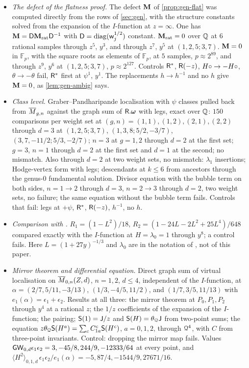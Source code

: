 \begin{itemize}
\item \emph{The defect of the flatness proof.} The defect $\mathbf{M}$ of \cref{prop:gen-flat} was computed directly from the rows of \cref{sec:gen}, with the structure constants solved from the expansion of the $I$-function at $z=\infty$. One has $\mathbf{M}=\mathsf{D}\mathbf{M}_{\mathrm{rat}}\mathsf{D}^{-1}$ with $\mathsf{D}=\mathrm{diag}(\mathsf{w}_j^{1/2})$ constant. $\mathbf{M}_{\mathrm{rat}}=0$ over $\mathbb{Q}$ at $6$ rational samples through $z^5$, $y^3$, and through $z^7$, $y^5$ at $(1,2,5;3,7)$. $\mathbf{M}=0$ in $\mathbb{F}_p$, with the square roots as elements of $\mathbb{F}_p$, at $5$ samples, $p\approx 2^{89}$, and through $z^9$, $y^6$ at $(1,2,5;3,7)$, $p\approx 2^{127}$. Controls $\mathsf{R}^*$, $\mathsf{R}(-z)$, $H\circ\to-H\circ$, $\theta\to-\theta$ fail, $\mathsf{R}^*$ first at $\psi^1$, $y^1$. The replacements $h\to h^{-1}$ and no $h$ give $\mathbf{M}=0$, as \cref{lem:gen-ambig} says.
\item \emph{Class level.} Graber--Pandharipande localisation with $\psi$ classes pulled back from $\overline{M}_{g,n}$ against the graph sum of $\mathsf{R}.\boldsymbol{\omega}$ with legs, exact over $\mathbb{Q}$: $150$ comparisons per weight set at $(g,n)=(1,1),(1,2),(2,1),(2,2)$ through $d=3$ at $(1,2,5;3,7)$, $(1,3,8;5/2,-3/7)$, $(3,7,-11/2;5/3,-2/7)$; $n=3$ at $g=1,2$ through $d=2$ at the first set; $g=3$, $n=1$ through $d=2$ at the first set and $d=1$ at the second; no mismatch. Also through $d=2$ at two weight sets, no mismatch: $\lambda_1$ insertions; Hodge-vertex form with legs; descendants at $k\leq 6$ from ancestors through the genus-$0$ fundamental solution. Divisor equation with the bubble term on both sides, $n=1\to2$ through $d=3$, $n=2\to3$ through $d=2$, two weight sets, no failure; the same equation without the bubble term fails. Controls that fail: legs at $+\psi$, $\mathsf{R}^*$, $\mathsf{R}(-z)$, $h^{-1}$, no $h$.
\item \emph{Comparison with \cite{LP18}.} $R_1=(1-L^2)/18$, $R_2=(1-24L-2L^2+25L^4)/648$ compared exactly with the $I$-function at $H=\lambda_0=1$ through $y^8$; a control fails. Here $L=(1+27y)^{-1/3}$ and $\lambda_0$ are in the notation of \cite{LP18}, not of this paper.
\item \emph{Mirror theorem and differential equation.} Direct graph sum of virtual localisation on $\overline{M}_{0,n}(Z,d)$, $n=1,2$, $d\leq 4$, independent of the $I$-function, at $\alpha=(2/7,5/11,-3/13)$, $(1/3,-4/5,11/2)$, and $(1/7,3/5,11/13)$ with $e_1(\alpha)=\epsilon_1+\epsilon_2$. Results at all three: the mirror theorem at $P_0,P_1,P_2$ through $y^4$ at a rational $z$; the $1/z$ coefficients of the expansion of the $I$-function; the pairing; $\mathsf{S}(1)=\mathsf{J}/z$ and $\mathsf{S}(H)=\theta_{\mathcal{Q}}\mathsf{J}$ from two-point sums; the equation $z\theta_{\mathcal{Q}}\mathsf{S}(H^a)=\sum_cC^c_{1a}\mathsf{S}(H^c)$, $a=0,1,2$, through $\mathcal{Q}^4$, with $C$ from three-point invariants. Control: dropping the mirror map fails. Values $\mathsf{GW}_{0,d}\epsilon_1\epsilon_2=3,-45/8,244/9,-12333/64$ at every point, and $\langle H^2\rangle_{0,1,d}\,\epsilon_1\epsilon_2/e_1(\alpha)=-5,87/4,-1544/9,27671/16$.
\end{itemize}

